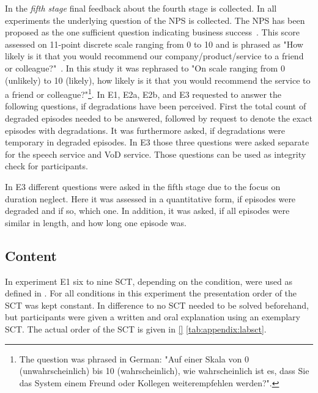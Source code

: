 In the \emph{fifth stage} final feedback about the fourth stage is collected.
In all experiments the underlying question of the \ac{NPS} is collected.
The \ac{NPS} has been proposed as the one sufficient question indicating business success~\citep[\cf,][]{reichheld_one_2003}.
This score assessed on 11-point discrete scale ranging from 0 to 10 and is phrased as "How likely is it that you would recommend our company/product/service to a friend or colleague?"~\citep[][p. 5]{reichheld_one_2003}.
In this study it was rephrased to "On scale ranging from 0 (unlikely) to 10 (likely), how likely is it that you would recommend the service to a friend or colleague?"\footnote{The question was phrased in German: "Auf einer Skala von 0 (unwahrscheinlich) bis 10 (wahrscheinlich), wie wahrscheinlich ist es, dass Sie das System einem Freund oder Kollegen weiterempfehlen werden?".}.
In E1, E2a, E2b, and E3 requested to answer the following questions, if degradations have been perceived.
First the total count of degraded episodes needed to be answered, followed by request to denote the exact episodes with degradations.
It was furthermore asked, if degradations were temporary in degraded episodes. 
In E3 those three questions were asked separate for the speech service and \ac{VoD} service.
Those questions can be used as integrity check for participants.

In E3 different questions were asked in the fifth stage due to the focus on duration neglect.
Here it was assessed in a quantitative form, if episodes were degraded and if so, which one.
In addition, it was asked, if all episodes were similar in length, and how long one episode was.

\subsection{Content}
In experiment E1 six to nine \acs{SCT}, depending on the condition, were used as defined in \cite{itu-t_p.805:_2007}.
For all conditions in this experiment the presentation order of the \acs{SCT} was kept constant.
In difference to \cite{itu-t_p.805:_2007} no \ac{SCT} needed to be solved beforehand, but participants were given a written and oral explanation using an exemplary \ac{SCT}.
The actual order of the \acs{SCT} is given in \autoref{} \autoref{tab:appendix:labsct}.

